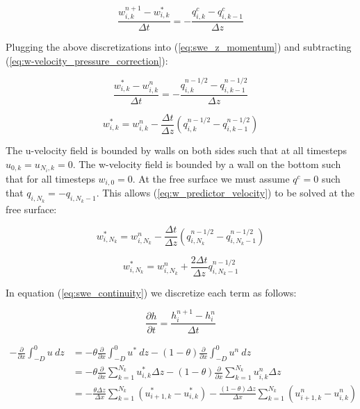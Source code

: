 \documentclass[12pt]{article}
\begin{document}
\begin{equation} \label{eq:w-velocity_pressure_correction}
\frac{w_{i,k}^{n+1} - w_{i,k}^*}{\Delta t} = -\frac{q_{i,k}^c - q_{i,k-1}^c}{\Delta z} 
\end{equation}

Plugging the above discretizations into (\ref{eq:swe_z_momentum}) and subtracting (\ref{eq:w-velocity_pressure_correction}):

\begin{equation*}
\frac{w_{i,k}^* - w_{i,k}^n}{\Delta t} = - \frac{q_{i,k}^{n-1/2} - q_{i,k-1}^{n-1/2}}{\Delta z}
\end{equation*}

\begin{equation} \label{eq:w_predictor_velocity}
w_{i,k}^* = w_{i,k}^n - \frac{\Delta t}{\Delta z} (q_{i,k}^{n-1/2} - q_{i,k-1}^{n-1/2})
\end{equation}

The u-velocity field is bounded by walls on both sides such that at all timesteps $u_{0,k} = u_{N_i,k} = 0$. The w-velocity field is bounded by a wall on the bottom such that for all timesteps $w_{i,0} = 0$. At the free surface we must assume $q^c = 0$ such that $q_{i,N_k} = -q_{i,N_k-1}$. This allows (\ref{eq:w_predictor_velocity}) to be solved at the free surface:

\begin{equation*}
w_{i,N_k}^* = w_{i,N_k}^n - \frac{\Delta t}{\Delta z} (q_{i,N_k}^{n-1/2} - q_{i,N_k-1}^{n-1/2})
\end{equation*}

\begin{equation} \label{eq:w_str_free_surface}
w_{i,N_k}^* = w_{i,N_k}^n + \frac{2\Delta t}{\Delta z} q_{i,N_k-1}^{n-1/2}
\end{equation}

In equation (\ref{eq:swe_continuity}) we discretize each term as follows:

\begin{equation*}
\frac{\partial h}{\partial t} = \frac{h_{i}^{n+1} - h_i^n}{\Delta t}
\end{equation*}

\begin{align*}
-\frac{\partial}{\partial x} \int_{-D}^{0} u~ dz &= - \theta  \frac{\partial}{\partial x} \int_{-D}^{0} u^*~ dz - (1-\theta) \frac{\partial}{\partial x} \int_{-D}^{0} u^n~ dz
\\
 &= - \theta  \frac{\partial}{\partial x} \sum_{k=1}^{N_k} u_{i,k}^* \Delta z - (1-\theta) \frac{\partial}{\partial x} \sum_{k=1}^{N_k} u_{i,k}^n \Delta z
\\
 &= - \frac{\theta \Delta z}{\Delta x} \sum_{k=1}^{N_k} (u_{i+1,k}^* - u_{i,k}^*) -  \frac{(1-\theta) \Delta z}{\Delta x} \sum_{k=1}^{N_k} (u_{i+1,k}^n - u_{i,k}^n)
\end{align*}
\end{document}
